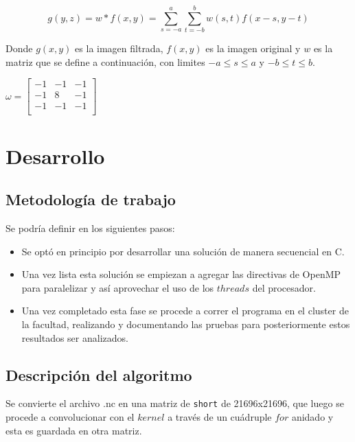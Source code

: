 \documentclass[a4paper]{article}
\begin{document}
\begin{equation}
	g(y,z) = w*f(x,y)=\sum_{s=-a}^{a}  \sum_{t=-b}^{b}  w(s,t) f(x-s, y-t)
\end{equation}

Donde $g(x,y)$ es la imagen filtrada, $f(x,y)$ es la imagen original y $w$ es la matriz que se define a continuación, con limites $-a \leq s \leq a$ y $-b \leq t \leq b$.

\begin{center}

$
\omega=
  \begin{bmatrix}
    -1 & -1 & -1\\
    -1 & 8 & -1\\
    -1 & -1 & -1\\
    
  \end{bmatrix}
$

\end{center}

\clearpage

\section{Desarrollo}
\subsection{Metodología de trabajo}
Se podría definir en los siguientes pasos:
\begin{itemize}
\item Se optó en principio por desarrollar una solución de manera secuencial en C.
\item Una vez lista esta solución se empiezan a agregar las directivas de OpenMP para paralelizar y así aprovechar el uso de los $threads$ del procesador.
\item Una vez completado esta fase se procede a correr el programa en el cluster de la facultad, realizando y documentando las pruebas para posteriormente estos resultados ser analizados.
\end{itemize}

\subsection{Descripción del algoritmo}
Se convierte el archivo .nc en una matriz de \texttt{short} de 21696x21696, que luego se procede a convolucionar con el $kernel$ a través de un cuádruple $for$ anidado y esta es guardada en otra matriz. 
\end{document}
